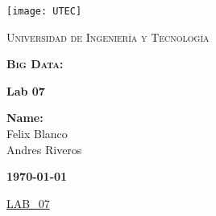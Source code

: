 \documentclass[a4paper, 10pt]{report}
\begin{document}
\begin{titlepage}
	\centering
	\texttt{[image: UTEC]} \par \vspace{1cm}
	{\scshape\LARGE Universidad de Ingeniería y Tecnología \par}
	\vspace{2cm}
	{\scshape\huge\bfseries Big Data: \par}
	{\huge\bfseries Lab 07\par}
	\vspace{4cm}
	{\Large {\bfseries Name:} \\
					Felix Blanco \\
					Andres Riveros \\
	\par}
	\vfill
	{\large\bfseries \today \par}
\end{titlepage}

 \href{https://github.com/BTbackM/BIG_DATA/tree/main/WEEK_07/LAB_07/}{LAB\_07}



\end{document}
